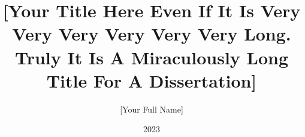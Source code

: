 \documentclass[]{dukedissertation2023}
\author{[Your Full Name]}
\title{[Your Title Here Even If It Is Very Very Very Very Very Very Long. Truly It Is A Miraculously Long Title For A Dissertation]}
\date{2023} %
\begin{document}
\maketitle


\dedication{If you want to dedicate your thesis to anyone do so here.}

\tableofcontents %

\listoftables	%

\listoffigures	%




%
%
%




\end{document}
